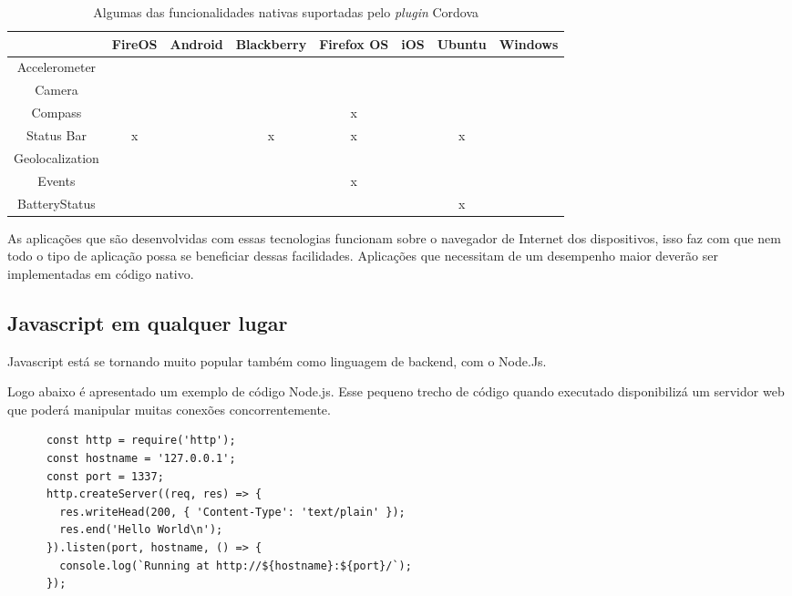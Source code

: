\begin{table}[!htb]
	\footnotesize
	\centering
	\caption[Funcionalidades nativas suportadas pelo \textit{plugin} Cordova]{Algumas das funcionalidades nativas suportadas pelo \textit{plugin} Cordova}
	\begin{tabular}{*8{c|}}
		 & \textbf{FireOS} & \textbf{Android} & \textbf{Blackberry} & \textbf{Firefox OS} & \textbf{iOS} & \textbf{Ubuntu} & \textbf{Windows}\\ \hline
		Accelerometer & \checkmark & \checkmark & \checkmark & \checkmark & \checkmark & \checkmark & \checkmark\\ \hline \SPACE
		Camera & \checkmark & \checkmark & \checkmark & \checkmark & \checkmark & \checkmark & \checkmark\\ \hline \SPACE
		Compass & \checkmark & \checkmark & \checkmark & x & \checkmark & \checkmark & \checkmark\\ \hline \SPACE
		Status Bar & x & \checkmark & x & x & \checkmark & x & \checkmark\\ \hline \SPACE
		Geolocalization & \checkmark & \checkmark & \checkmark & \checkmark & \checkmark & \checkmark & \checkmark\\ \hline \SPACE
		Events & \checkmark & \checkmark & \checkmark & x & \checkmark & \checkmark & \checkmark\\ \hline \SPACE
		BatteryStatus & \checkmark & \checkmark & \checkmark & \checkmark & \checkmark & x & \checkmark\\
		\hline
	\end{tabular}
	\label{tab:cordova}
\end{table}

As aplicações que são desenvolvidas com essas tecnologias funcionam sobre o navegador de Internet dos dispositivos, isso faz com que nem todo o tipo de aplicação possa se beneficiar dessas facilidades. Aplicações que necessitam de um desempenho maior deverão ser implementadas em código nativo.

\subsection{Javascript em qualquer lugar}
Javascript está se tornando muito popular também como linguagem de backend, com o Node.Js.

Logo abaixo é apresentado um exemplo de código Node.js. Esse pequeno trecho de código quando executado disponibilizá um servidor web que poderá manipular muitas conexões concorrentemente.
\begin{footnotesize}
	\begin{verbatim}
	  const http = require('http');
	  const hostname = '127.0.0.1';
	  const port = 1337;
	  http.createServer((req, res) => {
	    res.writeHead(200, { 'Content-Type': 'text/plain' });
	    res.end('Hello World\n');
	  }).listen(port, hostname, () => {
	    console.log(`Running at http://${hostname}:${port}/`);
	  });
	\end{verbatim}
\end{footnotesize}

